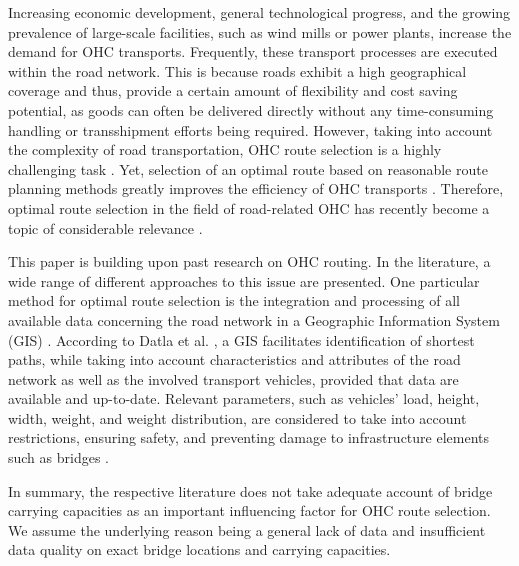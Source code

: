%

Increasing economic development, general technological progress, and the growing prevalence of large-scale facilities, such as wind mills or power plants, increase the demand for OHC transports.
Frequently, these transport processes are executed within the road network. This is because roads exhibit a high geographical coverage and thus, provide a certain amount of flexibility and cost saving potential, as goods can often be delivered directly without any time-consuming handling or transshipment efforts being required. However, taking into account the complexity of road transportation, OHC route selection is a highly challenging task \cite{Bazaras.2013, xu2001methodology, sivilevicius2007dynamics}.
Yet, selection of an optimal route based on reasonable route planning methods greatly improves the efficiency of OHC transports \cite{meng2015optimized}.
Therefore, optimal route selection in the field of road-related OHC has recently become a topic of considerable relevance \cite{geisberger2011efficient}.
\par
This paper is building upon past research on OHC routing. In the literature, a wide range of different approaches to this issue are presented.
One particular method for optimal route selection is the integration and processing of all available data concerning the road network in a Geographic Information System (GIS) \cite{durham2002gis}.
According to Datla et al. \cite{datla2004gis}, a GIS facilitates identification of shortest paths, while taking into account characteristics and attributes of the road network as well as the involved transport vehicles, provided that data are available and up-to-date. Relevant parameters, such as vehicles' load, height, width, weight, and weight distribution, are considered to take into account restrictions, ensuring safety, and preventing damage to infrastructure elements such as bridges \cite{ecmt2006improving, vaitkus2016effect, kombe2017modelling, pauer2017development}.
\par
In summary, the respective literature does not take adequate account of bridge carrying capacities as an important influencing factor for OHC route selection. We assume the underlying reason being a general lack of data and insufficient data quality on exact bridge locations and carrying capacities.



%
%
%
%
